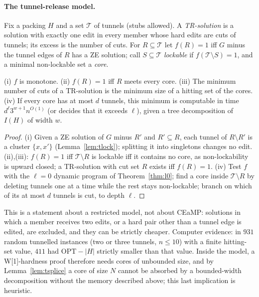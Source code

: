 \paragraph{The tunnel-release model.} Fix a packing $H$ and a set $\mathcal T$ of tunnels (stubs allowed). A \emph{TR-solution} is a solution with exactly one edit in every member whose hard edits are cuts of tunnels; its excess is the number of cuts. For $R\subseteq\mathcal T$ let $f(R)=1$ iff $G$ minus the tunnel edges of $R$ has a ZE solution; call $S\subseteq\mathcal T$ \emph{lockable} if $f(\mathcal T\setminus S)=1$, and a minimal non-lockable set a \emph{core}.
\begin{proposition}\label{prop:tTR}
(i) $f$ is monotone. (ii) $f(R)=1$ iff $R$ meets every core. (iii) The minimum number of cuts of a TR-solution is the minimum size of a hitting set of the cores. (iv) If every core has at most $d$ tunnels, this minimum is computable in time $d^{\ell}3^{w+1}n^{O(1)}$ (or decides that it exceeds $\ell$), given a tree decomposition of $I(H)$ of width $w$.
\end{proposition}
\begin{proof}
(i) Given a ZE solution of $G$ minus $R'$ and $R'\subseteq R$, each tunnel of $R\setminus R'$ is a cluster $\{x,x'\}$ (Lemma~\ref{lem:tlock}); splitting it into singletons changes no edit. (ii),(iii): $f(R)=1$ iff $\mathcal T\setminus R$ is lockable iff it contains no core, as non-lockability is upward closed; a TR-solution with cut set $R$ exists iff $f(R)=1$. (iv) Test $f$ with the $\ell=0$ dynamic program of Theorem~\ref{thm:l0}; find a core inside $\mathcal T\setminus R$ by deleting tunnels one at a time while the rest stays non-lockable; branch on which of its at most $d$ tunnels is cut, to depth $\ell$.
\end{proof}
This is a statement about a restricted model, not about CEaMP: solutions in which a member receives two edits, or a hard pair other than a tunnel edge is edited, are excluded, and they can be strictly cheaper. Computer evidence: in $931$ random tunnelled instances (two or three tunnels, $n\le10$) with a finite hitting-set value, $411$ had $\mathrm{OPT}-|H|$ strictly smaller than that value. Inside the model, a W[1]-hardness proof therefore needs cores of unbounded size, and by Lemma~\ref{lem:tsplice} a core of size $N$ cannot be absorbed by a bounded-width decomposition without the memory described above; this last implication is heuristic.


